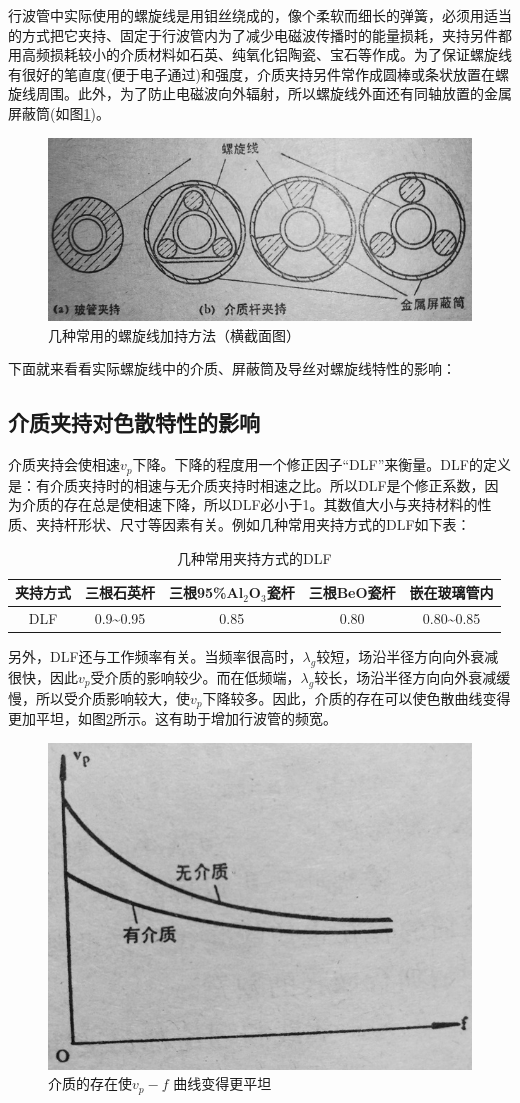 行波管中实际使用的螺旋线是用钼丝绕成的，像个柔软而细长的弹簧，必须用适当的方式把它夹持、固定于行波管内为了减少电磁波传播时的能量损耗，夹持另件都用高频损耗较小的介质材料如石英、纯氧化铝陶瓷、宝石等作成。为了保证螺旋线有很好的笔直度(便于电子通过)和强度，介质夹持另件常作成圆棒或条状放置在螺旋线周围。此外，为了防止电磁波向外辐射，所以螺旋线外面还有同轴放置的金属屏蔽筒(如图\ref{ch3-9})。
\begin{figure}[phtb]
	\centering
	\includegraphics[width=0.65\linewidth]{figure/ch3-9}
	\caption{几种常用的螺旋线加持方法（横截面图）}
	\label{ch3-9}
\end{figure}

下面就来看看实际螺旋线中的介质、屏蔽筒及导丝对螺旋线特性的影响：
\subsection{介质夹持对色散特性的影响}
介质夹持会使相速$ v_p $下降。下降的程度用一个修正因子“DLF”来衡量。DLF的定义是：有介质夹持时的相速与无介质夹持时相速之比。所以DLF是个修正系数，因为介质的存在总是使相速下降，所以DLF必小于1。其数值大小与夹持材料的性质、夹持杆形状、尺寸等因素有关。例如几种常用夹持方式的DLF如下表：
\begin{table} 
	\caption{几种常用夹持方式的DLF}\label{tab:3-1}
	\begin{tabular}{ccccc}
		\toprule
		\centering 
		夹持方式 & 三根石英杆                  & 三根95\%Al$ _2 $O$ _3 $瓷杆 & 三根BeO瓷杆 & 嵌在玻璃管内                    \\ \midrule
		DLF                & 0.9\textasciitilde 0.95 & 0.85                    & 0.80    & 0.80\textasciitilde 0.85 \\ \bottomrule
	\end{tabular}
\end{table}


 另外，DLF还与工作频率有关。当频率很高时，$ \lambda_g $较短，场沿半径方向向外衰减很快，因此$ v_p $受介质的影响较少。而在低频端，$ \lambda_g $较长，场沿半径方向向外衰减缓慢，所以受介质影响较大，使$ v_p $下降较多。因此，介质的存在可以使色散曲线变得更加平坦，如图\ref{ch3-10}所示。这有助于增加行波管的频宽。
 \begin{figure}[phtb]
 	\centering
 	\includegraphics[width=0.45\linewidth]{figure/ch3-10}
 	\caption{介质的存在使$ v_p-f $ 曲线变得更平坦}
 	\label{ch3-10}
 \end{figure}
